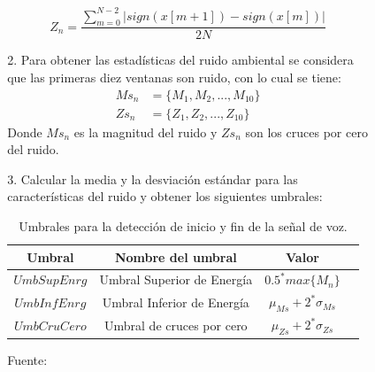 \begin{enumerate}
\begin{enumerate}
\begin{enumerate}
\begin{enumerate}
\begin{equation}
\label{eq:ecuacion23}
Z_{n} = \frac{\sum\limits_{m=0}^{N-2}\left | sign(x[m+1]) - sign(x[m]) \right |}{2N}
\end{equation}
\item[2.]Para obtener las estadísticas del ruido ambiental se considera que las primeras diez ventanas son ruido, con lo cual se tiene:
\begin{equation}
\label{eq:ecuacion24}
\begin{split}
Ms_{n} &= \{M_{1},M_{2},...,M_{10}\}\\ 
Zs_{n} &= \{Z_{1},Z_{2},...,Z_{10}\}
\end{split}
\end{equation}
Donde $Ms_{n}$ es la magnitud del ruido y $Zs_{n}$ son los cruces por cero del ruido.
\item[3.]Calcular la media y la desviación estándar para las características del ruido y obtener los siguientes umbrales:
\begin{center}
\begin{table}[h!]
\centering
\caption{\small{Umbrales para la detección de inicio y fin de la señal de voz.}}
\label{table:tabla2.3}
\vskip 0.2cm
\begin{tabular}{|c|c|c|c|}
\hline
{\small\textbf{Umbral}} & {\small\textbf{Nombre del umbral}} & {\small\textbf{Valor}}  \\ 
\hline 
{\small $UmbSupEnrg$} & {\small Umbral Superior de Energía} & {\small $0.5^{*}max\{M_{n}\}$}  \\ 
\hline 
{\small $UmbInfEnrg$} & {\small Umbral Inferior de Energía} & {\small $\mu_{Ms} + 2^{*}\sigma_{Ms}$}  \\ 
\hline 
{\small $UmbCruCero$} & {\small Umbral de cruces por cero} & {\small $\mu_{Zs} + 2^{*}\sigma_{Zs}$}  \\ 
\hline
\end{tabular} 
\begin{center}
\vskip 0.2cm
{\small{Fuente: \cite{unam}}}
\end{center}
\end{table}
\end{center}


\end{enumerate}
\end{enumerate}
\end{enumerate}
\end{enumerate}
